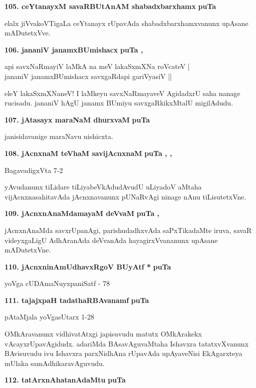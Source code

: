 \medskip
\noindent
\textbf{105. ceYtanayxM savaRBUtAnAM shabadxbarxhamx} \hfill{\bf puTa \pageref{203}}

\smallskip
elalx jiVvakoVTigaLa ceYtanayx rUpavAda shabadxbarxhamxvanunx upAsane mADutetxVve.

\medskip
\noindent
\textbf{106. jananiV janamxBUmishacx} \hfill{\bf puTa \pageref{101}, \pageref{103}}

\begin{shloka}
api savxNaRmayiV laMkA na meV lakaSxmXNa roVcateV |\\
jananiV janamxBUmishacx savxgaRdapi gariVyasiV ||
\end{shloka}

eleY lakaSxmXNaneV! I laMkeyu savxNaRmayaveV AgidadxrU saha nanage rucisadu. jananiV hAgU janamx BUmiyu savxgaRkikxMtalU migilAdudu.

\medskip
\noindent
\textbf{107. jAtasayx maraNaM dhurxvaM} \hfill{\bf puTa \pageref{122}}

\smallskip
janisidavanige maraNavu nishicxta.

\medskip
\noindent
\textbf{108. jAcnxnaM teVhaM savijAcnxnaM} \hfill{\bf puTa \pageref{19}, \pageref{72}, \pageref{102}}

\hfill{BagavadigxVta 7-2}

yAvudanunx tiLidare tiLiyabeVkAdudAvudU uLiyadoV aMtaha vijAcnxnasahitavAda jAcnxna\-vanunx pUNaRvAgi ninage nAnu tiLisutetxVne.

\medskip
\noindent
\textbf{109. jAcnxnAnaMdamayaM deVvaM} \hfill{\bf puTa \pageref{80}, \pageref{102}}

\smallskip
jAcnxnAnaMda savxrUpanAgi, parishudadhxvAda saPxTikadaMte iruva, savaR videyxgaLigU AdhAranAda deVva\-nAda hayagirxVvananunx upAsane mADutetxVne.

\medskip
\noindent
\textbf{110. jAcnxninAmUdhavxRgoV BUyAtf *} \hfill{\bf puTa \pageref{133}}

\hfill{yoVga cUDAmaNuyxpaniSatf - 78}

\medskip
\noindent
\textbf{111. tajajxpaH tadathaRBAvanamf} \hfill{\bf puTa \pageref{147}}

\hfill{pAtaMjala yoVgasUtarx 1-28}

\smallskip
OMkAravanunx vidhivatAtxgi japisuvudu matutx OMkArakekx vAcayxrUpavAgidudx. adariMda BAsavAgu\-vaMtaha Ishavxra tatatxvXvanunx BAvisuvudu ivu Ishavxra parxNidhAna rUpavAda upAyaveNisi EkAgarxteya mUlaka samAdhikaravAguvudu.

\medskip
\noindent
\textbf{112. tatArxnAhatanAdaMtu} \hfill{\bf puTa \pageref{151}}

